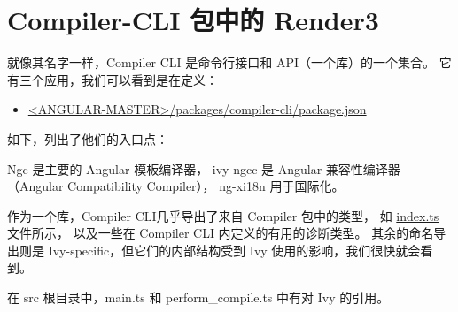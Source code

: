 \section{Compiler-CLI 包中的 Render3}


就像其名字一样，Compiler CLI 是命令行接口和 API（一个库）的一个集合。
它有三个应用，我们可以看到是在定义：

\begin{itemize}
  \item \href{https://github.com/angular/angular/blob/master/packages/compiler-cli/package.json}
        {<ANGULAR-MASTER>/packages/compiler-cli/package.json}
\end{itemize}


如下，列出了他们的入口点：




Ngc 是主要的 Angular 模板编译器，
ivy-ngcc 是 Angular 兼容性编译器（Angular Compatibility Compiler），
ng-xi18n 用于国际化。


作为一个库，Compiler CLI几乎导出了来自 Compiler 包中的类型，
如
\href{https://github.com/angular/angular/blob/master/packages/compiler-cli/index.ts}
{index.ts} 文件所示，
以及一些在 Compiler CLI 内定义的有用的诊断类型。
其余的命名导出则是 Ivy-specific，但它们的内部结构受到 Ivy 使用的影响，我们很快就会看到。


在 src 根目录中，main.ts 和 perform\_compile.ts 中有对 Ivy 的引用。

